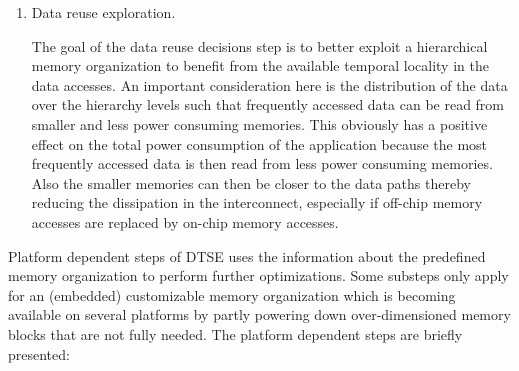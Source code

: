 \begin{enumerate}
  \item Data reuse exploration.
  
The goal of the data reuse decisions step is to better exploit a hierarchical memory organization to benefit from the available temporal locality in the data accesses. 
An important consideration here is the distribution of the data over the hierarchy levels such that frequently accessed data can be read from smaller and less power consuming memories. 
This obviously has a positive effect on the total power consumption of the application because the most frequently accessed data is then read from less power consuming memories. 
Also the smaller memories can then be closer to the data paths thereby reducing the dissipation in the interconnect, especially if off-chip memory accesses are replaced by on-chip memory accesses.
 
\end{enumerate}

Platform dependent steps of DTSE uses the information about the predefined memory organization to perform further optimizations. 
Some substeps only apply for an (embedded) customizable memory organization which is becoming available on several platforms by partly powering down over-dimensioned memory blocks that are not fully needed. The platform dependent steps are briefly presented:

